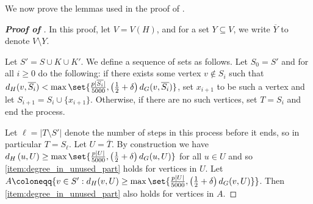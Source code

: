 \documentclass[10pt,a4paper,reqno]{amsart}
\begin{document}
We now prove the lemmas used in the proof of .
\begin{proof}[\textbf{Proof of }]
In this proof, let $V=V(H)$, and for a set $Y\subseteq V$, we write $\overline{Y}$ to denote $V\setminus Y$.

Let $S' = S \cup K \cup K'$.
We define a sequence of sets as follows. Let $S_0=S'$ and for all $i \ge 0$ do the following:
 if there exists some vertex $v \not\in S_i$ such that $d_H(v,\overline{S_i}) < \max\set{\frac{p|\overline{S_i}|}{5000}, \left(\tfrac{1}{2}+\delta\right)d_G(v,\overline{S_i})}$, set $x_{i+1}$ to be such a vertex and let $S_{i+1}= S_i \cup \{x_{i+1}\}$. 
Otherwise, if there are no such vertices, set $T=S_i$ and end the process. 


Let $\ell = |T\setminus S'|$ denote the number of steps in this process before it ends, so in particular $T=S_{\ell}$. Let $U = \overline{T}$. By construction we have $d_H\left(u,U\right) \ge \max\set{\frac{p|U|}{5000}, \left(\tfrac{1}{2}+\delta\right)d_G(u,U)}$ for all $u \in U$ and so \ref{item:degree_in_unused_part} holds for vertices in $U$.
Let $A \coloneqq \{v \in S' : d_H(v,U) \ge \max\set{\frac{p|U|}{5000}, \left(\tfrac{1}{2}+\delta\right)d_G(v,U)}\}$. Then \ref{item:degree_in_unused_part} also holds for vertices in $A$.


\end{proof}
\end{document}
